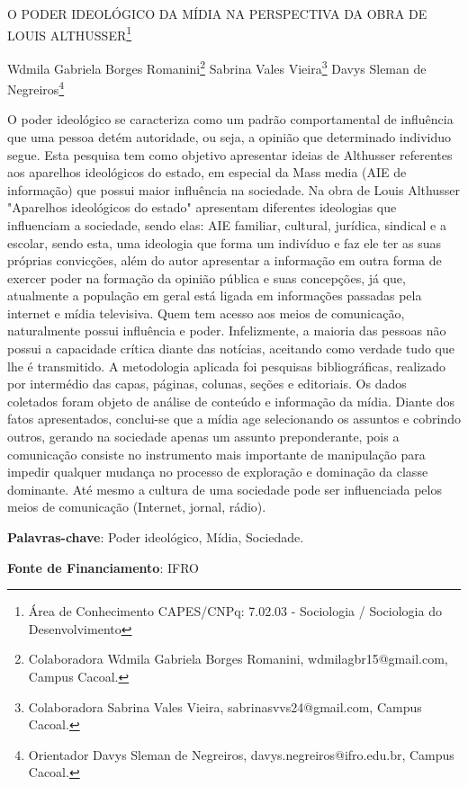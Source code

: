 \documentclass[article,12pt,onesidea,4paper,english,brazil]{abntex2}
\begin{document}
	
	
	\frenchspacing 
	
	\begin{center}
		\LARGE O PODER IDEOLÓGICO DA MÍDIA NA PERSPECTIVA DA OBRA DE LOUIS
		ALTHUSSER\footnote{Área de Conhecimento CAPES/CNPq: 7.02.03 - Sociologia / Sociologia do
			Desenvolvimento}
		
		\normalsize
		Wdmila Gabriela Borges Romanini\footnote{Colaboradora Wdmila Gabriela Borges Romanini, wdmilagbr15@gmail.com, Campus Cacoal.} 
		Sabrina Vales Vieira\footnote{Colaboradora Sabrina Vales Vieira, sabrinasvvs24@gmail.com, Campus Cacoal.} 
		Davys Sleman de Negreiros\footnote{Orientador Davys Sleman de Negreiros, davys.negreiros@ifro.edu.br, Campus Cacoal.} 
		
	\end{center}
	
	\noindent O poder ideológico se caracteriza como um padrão comportamental de influência
	que uma pessoa detém autoridade, ou seja, a opinião que determinado individuo
	segue. Esta pesquisa tem como objetivo apresentar ideias de Althusser referentes
	aos aparelhos ideológicos do estado, em especial da Mass media (AIE de
	informação) que possui maior influência na sociedade. Na obra de Louis Althusser
	"Aparelhos ideológicos do estado" apresentam diferentes ideologias que influenciam
	a sociedade, sendo elas: AIE familiar, cultural, jurídica, sindical e a escolar, sendo
	esta, uma ideologia que forma um indivíduo e faz ele ter as suas próprias
	convicções, além do autor apresentar a informação em outra forma de exercer poder
	na formação da opinião pública e suas concepções, já que, atualmente a população
	em geral está ligada em informações passadas pela internet e mídia televisiva.
	Quem tem acesso aos meios de comunicação, naturalmente possui influência e
	poder. Infelizmente, a maioria das pessoas não possui a capacidade crítica diante
	das notícias, aceitando como verdade tudo que lhe é transmitido. A metodologia
	aplicada foi pesquisas bibliográficas, realizado por intermédio das capas, páginas,
	colunas, seções e editoriais. Os dados coletados foram objeto de análise de
	conteúdo e informação da mídia. Diante dos fatos apresentados, conclui-se que a
	mídia age selecionando os assuntos e cobrindo outros, gerando na sociedade
	apenas um assunto preponderante, pois a comunicação consiste no instrumento
	mais importante de manipulação para impedir qualquer mudança no processo de
	exploração e dominação da classe dominante. Até mesmo a cultura de uma
	sociedade pode ser influenciada pelos meios de comunicação (Internet, jornal,
	rádio).
	
	\vspace{\onelineskip}
	
	\noindent
	\textbf{Palavras-chave}: Poder ideológico, Mídia, Sociedade.

	\noindent
	\textbf{Fonte de Financiamento}: IFRO
	
\end{document}

